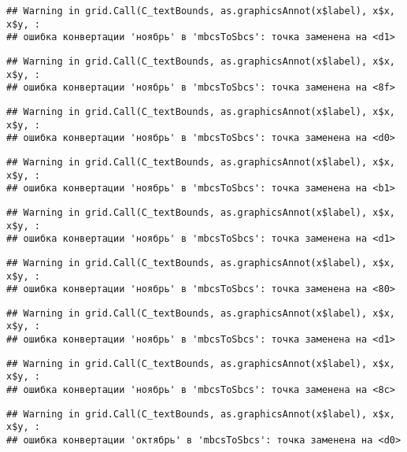 \documentclass[
]{article}
\begin{document}
\begin{verbatim}
## Warning in grid.Call(C_textBounds, as.graphicsAnnot(x$label), x$x, x$y, :
## ошибка конвертации 'ноябрь' в 'mbcsToSbcs': точка заменена на <d1>
\end{verbatim}

\begin{verbatim}
## Warning in grid.Call(C_textBounds, as.graphicsAnnot(x$label), x$x, x$y, :
## ошибка конвертации 'ноябрь' в 'mbcsToSbcs': точка заменена на <8f>
\end{verbatim}

\begin{verbatim}
## Warning in grid.Call(C_textBounds, as.graphicsAnnot(x$label), x$x, x$y, :
## ошибка конвертации 'ноябрь' в 'mbcsToSbcs': точка заменена на <d0>
\end{verbatim}

\begin{verbatim}
## Warning in grid.Call(C_textBounds, as.graphicsAnnot(x$label), x$x, x$y, :
## ошибка конвертации 'ноябрь' в 'mbcsToSbcs': точка заменена на <b1>
\end{verbatim}

\begin{verbatim}
## Warning in grid.Call(C_textBounds, as.graphicsAnnot(x$label), x$x, x$y, :
## ошибка конвертации 'ноябрь' в 'mbcsToSbcs': точка заменена на <d1>
\end{verbatim}

\begin{verbatim}
## Warning in grid.Call(C_textBounds, as.graphicsAnnot(x$label), x$x, x$y, :
## ошибка конвертации 'ноябрь' в 'mbcsToSbcs': точка заменена на <80>
\end{verbatim}

\begin{verbatim}
## Warning in grid.Call(C_textBounds, as.graphicsAnnot(x$label), x$x, x$y, :
## ошибка конвертации 'ноябрь' в 'mbcsToSbcs': точка заменена на <d1>
\end{verbatim}

\begin{verbatim}
## Warning in grid.Call(C_textBounds, as.graphicsAnnot(x$label), x$x, x$y, :
## ошибка конвертации 'ноябрь' в 'mbcsToSbcs': точка заменена на <8c>
\end{verbatim}

\begin{verbatim}
## Warning in grid.Call(C_textBounds, as.graphicsAnnot(x$label), x$x, x$y, :
## ошибка конвертации 'октябрь' в 'mbcsToSbcs': точка заменена на <d0>
\end{verbatim}
\end{document}
